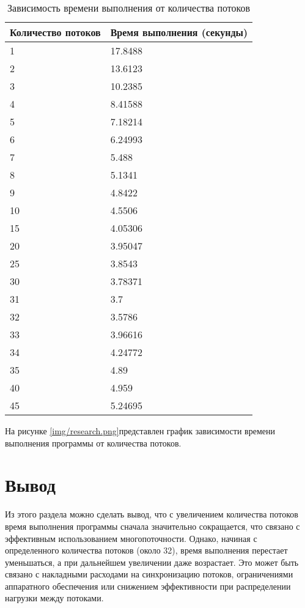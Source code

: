 \begin{table}[h!]
    \small
    \captionsetup{justification=raggedright, singlelinecheck=false, labelsep=endash}
    \caption{Зависимость времени выполнения от количества потоков}
    \label{tbl:execution_time_vs_threads}
    \begin{tabular}{|p{3cm}|p{5cm}|}
        \hline
        Количество потоков & Время выполнения (секунды) \\
        \hline
        1 & 17.8488 \\
        2 & 13.6123 \\
        3 & 10.2385 \\
        4 & 8.41588 \\
        5 & 7.18214 \\
        6 & 6.24993 \\
        7 & 5.488 \\
        8 & 5.1341 \\
        9 & 4.8422 \\
        10 & 4.5506 \\
        15 & 4.05306 \\
        20 & 3.95047 \\
        25 & 3.8543 \\
        30 & 3.78371 \\
        31 & 3.7 \\
        32 & 3.5786 \\
        33 & 3.96616 \\
        34 & 4.24772 \\
        35 & 4.89 \\
        40 & 4.959 \\
        45 & 5.24695 \\
        \hline
    \end{tabular}
\end{table}

На рисунке \ref{img/research.png}представлен график зависимости времени выполнения программы от количества потоков.

\section{Вывод}
Из этого раздела можно сделать вывод, что с увеличением количества потоков время выполнения программы сначала значительно сокращается, что связано с эффективным использованием многопоточности. Однако, начиная с определенного количества потоков (около 32), время выполнения перестает уменьшаться, а при дальнейшем увеличении даже возрастает. Это может быть связано с накладными расходами на синхронизацию потоков, ограничениями аппаратного обеспечения или снижением эффективности при распределении нагрузки между потоками.

